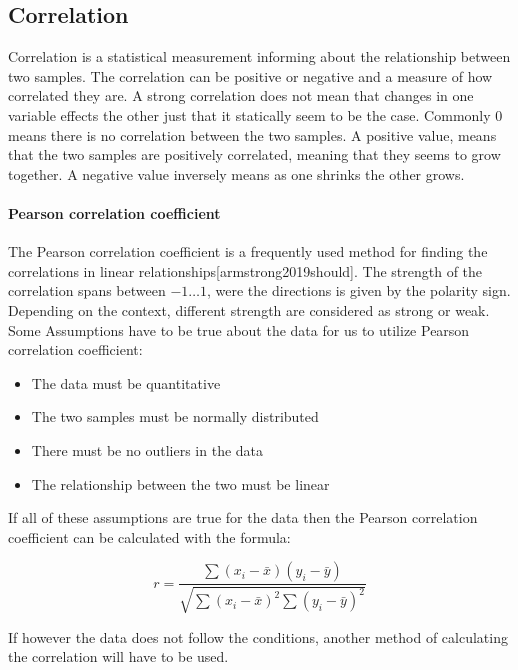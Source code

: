 \subsection{Correlation}
Correlation is a statistical measurement informing about the relationship between two samples. The correlation can be positive or negative and a measure of how correlated they are. A strong correlation does not mean that changes in one variable effects the other just that it statically seem to be the case. Commonly $0$ means there is no correlation between the two samples. A positive value, means that the two samples are positively correlated, meaning that they seems to grow together. A negative value inversely means as one shrinks the other grows.

\paragraph{Pearson correlation coefficient} The Pearson correlation coefficient is a frequently used method for finding the correlations in linear relationships[armstrong2019should]. The strength of the correlation spans between $-1 \dotsc 1$, were the directions is given by the polarity sign. Depending on the context, different strength are considered as strong or weak. Some Assumptions have to be true about the data for us to utilize Pearson correlation coefficient:

\begin{itemize}
    \item The data must be quantitative
    \item The two samples must be normally distributed
    \item There must be no outliers in the data
    \item The relationship between the two must be linear
\end{itemize}

If all of these assumptions are true for the data then the Pearson correlation coefficient can be calculated with the formula:

\begin{equation}
    r=\frac{\sum{(x_i-\bar{x})(y_i-\bar{y})}}{\sqrt{\sum{(x_i-\bar{x})^2}\sum{(y_i-\bar{y})^2}}}
\end{equation}

If however the data does not follow the conditions, another method of calculating the correlation will have to be used. 

